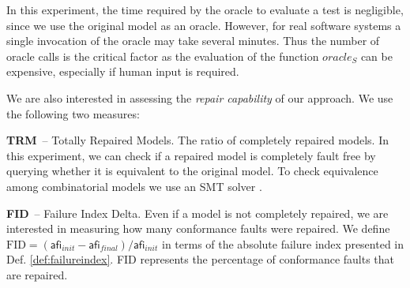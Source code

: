 \begin{tikzborder}{\cite{Gargantini16:validation}}
\begin{tikzborder}{\cite{gargantini_combinatorial_2017}}
In this experiment, the time required by the oracle to evaluate a test is negligible, since we use the original model as an oracle. However, for real software systems a single invocation of the 	oracle may take several minutes. Thus the number of oracle calls is 	the critical factor as the evaluation of the function $\mathit{oracle}_{S}$ can be 	expensive, especially if human input is required.

\smallskip
\noindent We are also interested in assessing the \emph{repair capability} of our approach. We use the following two measures:
\be

\begin{compactdesc}
	
	\newcommand{\TRM}{\textbf{TRM}\xspace}
	\newcommand{\FID}{\textbf{FID}\xspace}
	
	\item[\TRM\ -- Totally Repaired Models.] The ratio of completely repaired models. 
	In this experiment, we can check if a repaired model is completely fault free by querying whether it is equivalent to the original  model. To check equivalence among combinatorial models we use an SMT solver \cite{Arcaini2014}.
	
	\item[\FID\ -- Failure Index Delta.] Even if a model is not completely repaired, we are interested in measuring how many conformance faults were repaired. We define $\mathrm{FID} = (\mathsf{afi}_{init} - \mathsf{afi}_{final})/\mathsf{afi}_{init}$ in terms of the absolute failure index presented in Def. \ref{def:failureindex}. FID represents the percentage of conformance faults that are repaired.
	
\end{compactdesc}


\end{tikzborder}
\end{tikzborder}
